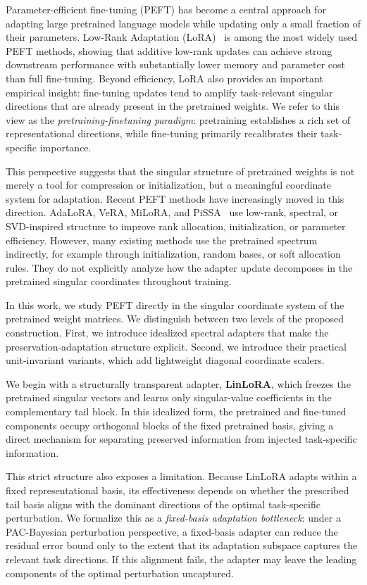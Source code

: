 Parameter-efficient fine-tuning (PEFT) has become a central approach for adapting large pretrained language models while updating only a small fraction of their parameters. Low-Rank Adaptation (LoRA)~\citep{hu2022lora} is among the most widely used PEFT methods, showing that additive low-rank updates can achieve strong downstream performance with substantially lower memory and parameter cost than full fine-tuning. Beyond efficiency, LoRA also provides an important empirical insight: fine-tuning updates tend to amplify task-relevant singular directions that are already present in the pretrained weights. We refer to this view as the \emph{pretraining-finetuning paradigm}: pretraining establishes a rich set of representational directions, while fine-tuning primarily recalibrates their task-specific importance.

This perspective suggests that the singular structure of pretrained weights is not merely a tool for compression or initialization, but a meaningful coordinate system for adaptation. Recent PEFT methods have increasingly moved in this direction. AdaLoRA, VeRA, MiLoRA, and PiSSA~\citep{zhang2023adalora, kopiczko2023vera, wang2025milora, meng2024pissa} use low-rank, spectral, or SVD-inspired structure to improve rank allocation, initialization, or parameter efficiency. However, many existing methods use the pretrained spectrum indirectly, for example through initialization, random bases, or soft allocation rules. They do not explicitly analyze how the adapter update decomposes in the pretrained singular coordinates throughout training.

In this work, we study PEFT directly in the singular coordinate system of the pretrained weight matrices. We distinguish between two levels of the proposed construction. First, we introduce idealized spectral adapters that make the preservation-adaptation structure explicit. Second, we introduce their practical unit-invariant variants, which add lightweight diagonal coordinate scalers.

We begin with a structurally transparent adapter, \textbf{LinLoRA}, which freezes the pretrained singular vectors and learns only singular-value coefficients in the complementary tail block. In this idealized form, the pretrained and fine-tuned components occupy orthogonal blocks of the fixed pretrained basis, giving a direct mechanism for separating preserved information from injected task-specific information.

This strict structure also exposes a limitation. Because LinLoRA adapts within a fixed representational basis, its effectiveness depends on whether the prescribed tail basis aligns with the dominant directions of the optimal task-specific perturbation. We formalize this as a \emph{fixed-basis adaptation bottleneck}: under a PAC-Bayesian perturbation perspective, a fixed-basis adapter can reduce the residual error bound only to the extent that its adaptation subspace captures the relevant task directions. If this alignment fails, the adapter may leave the leading components of the optimal perturbation uncaptured.

